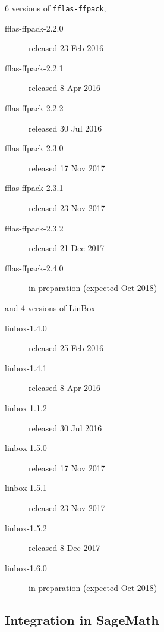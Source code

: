 \documentclass{deliverablereport}
\begin{document}
6 versions of \texttt{fflas-ffpack},
\begin{description}
  \item[fflas-ffpack-2.2.0] released 23 Feb 2016
  \item[fflas-ffpack-2.2.1] released 8 Apr 2016
  \item[fflas-ffpack-2.2.2] released 30 Jul 2016
  \item[fflas-ffpack-2.3.0] released 17 Nov 2017
  \item[fflas-ffpack-2.3.1] released 23 Nov 2017
  \item[fflas-ffpack-2.3.2] released 21 Dec 2017
  \item[fflas-ffpack-2.4.0] in preparation (expected Oct 2018)
\end{description}
and 4 versions of LinBox
\begin{description}
  \item[linbox-1.4.0] released 25 Feb 2016
  \item[linbox-1.4.1] released 8 Apr 2016
  \item[linbox-1.1.2] released 30 Jul 2016
  \item[linbox-1.5.0] released 17 Nov 2017
  \item[linbox-1.5.1] released 23 Nov 2017
  \item[linbox-1.5.2] released 8 Dec 2017
  \item[linbox-1.6.0] in preparation (expected Oct 2018)
\end{description}
\subsection{Integration in SageMath}
\end{document}
